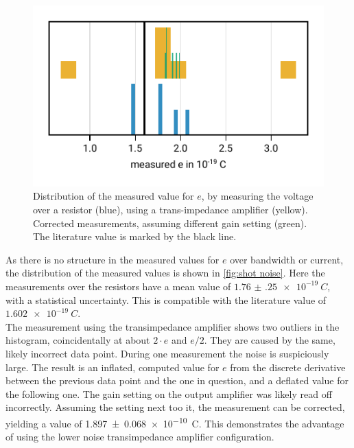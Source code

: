 \documentclass[
    parskip=half, 
    twoside=false,
    twocolumn=true,
    fontsize=11pt,
]{scrarticle}
\begin{document}
\begin{figure}[h!]
    \centering
    \includegraphics{figures/03 shot noise.pdf}
    \caption{
        Distribution of the measured value for $e$, by measuring the voltage over a resistor (blue), using a trans-impedance amplifier (yellow).
        Corrected measurements, assuming different gain setting (green). 
        The literature value is marked by the black line.
    }
    \label{fig:shot noise}
\end{figure}

As there is no structure in the measured values for $e$ over bandwidth or current, the distribution of the measured values is shown in \autoref{fig:shot noise}.
Here the measurements over the resistors have a mean value of $\SI{1.76(25)e-19}{C}$, with a statistical uncertainty.
This is compatible with the literature value of $\SI{1.602e-19}{C}$.\\
The measurement using the transimpedance amplifier shows two outliers in the histogram, coincidentally at about $2 \cdot e$ and $e/2$.
They are caused by the same, likely incorrect data point. During one measurement the noise is suspiciously large. The result is an inflated, computed value for $e$ from the discrete derivative between the previous data point and the one in question, and a deflated value for the following one. The gain setting on the output amplifier was likely read off incorrectly. 
Assuming the setting next too it, the measurement can be corrected, yielding a value of \SI{1.897(68)e-10}{C}.
This demonstrates the advantage of using the lower noise transimpedance amplifier configuration.
\end{document}

